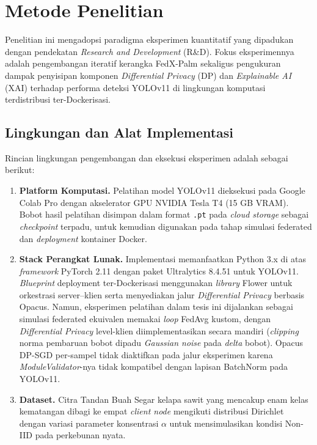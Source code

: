 \section{Metode Penelitian}
\label{sec:metode-penelitian}
Penelitian ini mengadopsi paradigma eksperimen kuantitatif yang dipadukan dengan pendekatan \emph{Research and Development} (R\&D). Fokus eksperimennya adalah pengembangan iteratif kerangka FedX-Palm sekaligus pengukuran dampak penyisipan komponen \emph{Differential Privacy} (DP) dan \emph{Explainable AI} (XAI) terhadap performa deteksi YOLOv11 di lingkungan komputasi terdistribusi ter-Dockerisasi.

\subsection{Lingkungan dan Alat Implementasi}
Rincian lingkungan pengembangan dan eksekusi eksperimen adalah sebagai berikut:
\begin{enumerate}
    \item \textbf{Platform Komputasi.} Pelatihan model YOLOv11 dieksekusi pada Google Colab Pro dengan akselerator GPU NVIDIA Tesla T4 (15 GB VRAM). Bobot hasil pelatihan disimpan dalam format \texttt{.pt} pada \emph{cloud storage} sebagai \emph{checkpoint} terpadu, untuk kemudian digunakan pada tahap simulasi federated dan \emph{deployment} kontainer Docker.
    \item \textbf{Stack Perangkat Lunak.} Implementasi memanfaatkan Python 3.x di atas \emph{framework} PyTorch 2.11 dengan paket Ultralytics 8.4.51 untuk YOLOv11. \emph{Blueprint} deployment ter-Dockerisasi menggunakan \emph{library} Flower untuk orkestrasi server--klien serta menyediakan jalur \emph{Differential Privacy} berbasis Opacus. Namun, eksperimen pelatihan dalam tesis ini dijalankan sebagai simulasi federated ekuivalen memakai \emph{loop} FedAvg kustom, dengan \emph{Differential Privacy} level-klien diimplementasikan secara mandiri (\emph{clipping} norma pembaruan bobot dipadu \emph{Gaussian noise} pada \emph{delta} bobot). Opacus DP-SGD per-sampel tidak diaktifkan pada jalur eksperimen karena \emph{ModuleValidator}-nya tidak kompatibel dengan lapisan BatchNorm pada YOLOv11.
    \item \textbf{Dataset.} Citra Tandan Buah Segar kelapa sawit yang mencakup enam kelas kematangan dibagi ke empat \emph{client node} mengikuti distribusi Dirichlet dengan variasi parameter konsentrasi $\alpha$ untuk mensimulasikan kondisi Non-IID pada perkebunan nyata.
\end{enumerate}

